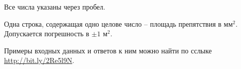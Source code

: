 Все числа указаны через пробел.

\outputfmtSection

Одна строка, содержащая одно целове число -- площадь препятствия в мм$^2$.
Допускается погрешность в $\pm 1$ м$^2$.

\exampleSection

Примеры входных данных и ответов к ним можно найти по сслыке \url{http://bit.ly/2Re5l9N}.

